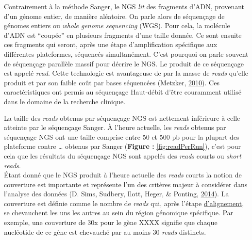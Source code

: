 \documentclass[12pt,twoside]{reedthesis}
\theoremstyle{definition}
\theoremstyle{definition}
\theoremstyle{remark}
\begin{document}
  Contrairement à la méthode Sanger, le NGS \emph{lit} des fragments
  d'ADN, provenant d'un génome entier, de manière aléatoire. On parle
  alors de séquençage de génomes entiers ou \emph{whole genome sequencing}
  (WGS). Pour cela, la molécule d'ADN est ``coupée'' en plusieurs
  fragments d'une taille donnée. Ce sont ensuite ces fragments qui seront,
  après une étape d'amplification spécifique aux différentes plateformes,
  séquencés simultanément. C'est pourquoi on parle souvent de séquençage
  parallèle massif pour décrire le NGS. Le produit de ce séquençage est
  appelé \emph{read}. Cette technologie est avantageuse de par la masse de
  \emph{reads} qu'elle produit et par son faible coût par bases séquencées
  (Metzker, \protect\hyperlink{ref-Metzker2010}{2010}). Ces
  caractéristiques ont permis au séquençage Haut-débit d'être couramment
  utilisé dans le domaine de la recherche clinique.
  
  La taille des \emph{reads} obtenus par séquençage NGS est nettement
  inférieure à celle atteinte par le séquençage Sanger. À l'heure
  actuelle, les \emph{reads} obtenus par séquençage NGS ont une taille
  comprise entre 50 et 500 pb pour la plupart des plateforme contre
  \ldots{} obtenus par Sanger (\textbf{Figure :} \ref{fig:readPerRun}),
  c'est pour cela que les résultats du séquençage NGS sont appelés des
  \emph{reads} courts ou \emph{short reads}.\\
  Étant donné que le NGS produit à l'heure actuelle des \emph{reads}
  courts la notion de couverture est importante et représente l'un des
  critères majeur à considérer dans l'analyse des données (D. Sims,
  Sudbery, Ilott, Heger, \& Ponting,
  \protect\hyperlink{ref-Sims2014}{2014}). La couverture est définie comme
  le nombre de \emph{reads} qui, après l'étape
  \protect\hyperlink{lalignement}{d'alignement}, se chevauchent les uns
  les autres au sein du région génomique spécifique. Par exemple, une
  couverture de 30x pour le gène XXXX signifie que chaque nucléotide de ce
  gène est chevauché par au moins 30 \emph{reads} distincts.
  
\end{document}
